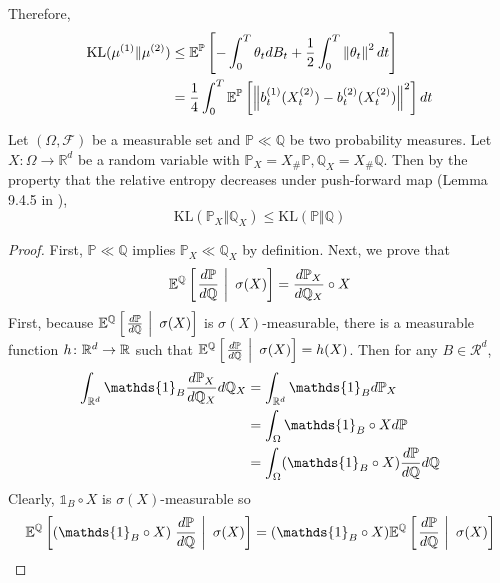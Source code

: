 \documentclass[a4paper,12pt]{article}
\begin{document}
\begin{enumerate}[label=(\arabic*)]
  Therefore,
  \begin{equation*}
    \begin{aligned}
      \operatorname{KL}(\mu^{(1)} \Vert \mu^{(2)}) &\leq \mathbb{E}^{\mathbb{P}}\left[-\int_0^T \theta_t d B_t+\frac{1}{2} \int_0^T \left\lVert\theta_t\right\lVert^2 d t\right] \\
      &=\frac{1}{4}\int_0^T\mathbb{E}^{\mathbb{P}}\left[\left\lVert b_t^{(1)}(X_t^{(2)})-b_t^{(2)}(X_t^{(2)})\right\lVert^2\right]dt
    \end{aligned}
  \end{equation*}
  \begin{rmk}
    Let $(\Omega, \mathcal{F})$ be a measurable set and $\mathbb{P}\ll\mathbb{Q}$ be two probability measures. Let $X : \Omega \rightarrow \mathbb{R}^d$ be a random variable with $\mathbb{P}_X = X_{\#}\mathbb{P},\mathbb{Q}_X=X_{\#}\mathbb{Q}$. Then by the property that the relative entropy decreases under push-forward map (Lemma 9.4.5 in \cite{ambrosio2008gradient}),
    \begin{equation*}
      \text{KL}(\mathbb{P}_X\Vert\mathbb{Q}_X) \leq\text{KL}(\mathbb{P}\Vert\mathbb{Q})
    \end{equation*}
    \begin{proof}
      First, $\mathbb{P}\ll\mathbb{Q}$ implies $\mathbb{P}_X\ll\mathbb{Q}_X$ by definition. Next, we prove that
      \begin{equation*}
        \mathbb{E}^{\mathbb{Q}}\left[ \left.\frac{d\mathbb{P}}{d\mathbb{Q}}~\right\lvert~\sigma(X)\right] = \frac{d\mathbb{P}_X}{d\mathbb{Q}_X}\circ X
      \end{equation*}
      First, because $\mathbb{E}^{\mathbb{Q}}\left[ \left.\frac{d\mathbb{P}}{d\mathbb{Q}}~\right\lvert~\sigma(X)\right]$ is $\sigma(X)$-measurable, there is a measurable function $h \colon \mathbb{R}^d \rightarrow \mathbb{R}$ such that $\mathbb{E}^{\mathbb{Q}}\left[ \left.\frac{d\mathbb{P}}{d\mathbb{Q}}~\right\lvert~\sigma(X)\right] = h(X)$. Then for any $B \in \mathcal{R}^d$,
      \begin{equation*}
        \begin{aligned}
          \int_{\R^d}\mathds{1}_B\frac{d\mathbb{P}_X}{d\mathbb{Q}_X} d\mathbb{Q}_X &= \int_{\R^d}\mathds{1}_Bd\mathbb{P}_X \\
          &= \int_\Omega \mathds{1}_B \circ X d\Pb \\
          &= \int_\Omega (\mathds{1}_B \circ X) \frac{d\mathbb{P}}{d\mathbb{Q}}d\mathbb{Q} 
        \end{aligned}
      \end{equation*}
      Clearly, $\mathds{1}_B \circ X$ is $\sigma(X)$-measurable so
      \begin{equation*}
        \E^{\mathbb{Q}}\bj{ (\mathds{1}_B \circ X)\lv{\frac{d\mathbb{P}}{d\mathbb{Q}}~}~\sigma(X)} = (\mathds{1}_B \circ X) \E^{\mathbb{Q}}\bj{ \lv{\frac{d\mathbb{P}}{d\mathbb{Q}}~}~\sigma(X)}

\end{equation*}
\end{proof}
\end{rmk}
\end{enumerate}
\end{document}
